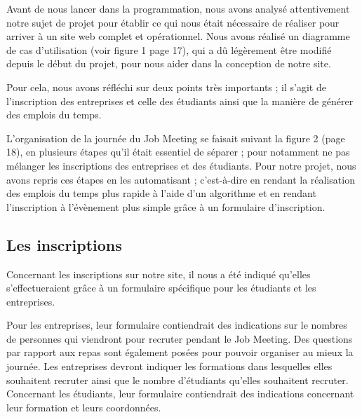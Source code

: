 \documentclass[12pt,a4paper]{article}
\begin{document}
\begin{large}
\begin{onehalfspace}Avant de nous lancer dans la programmation, nous avons analysé attentivement notre sujet de projet pour établir ce qui nous était nécessaire de réaliser pour arriver à un site web complet et opérationnel. Nous avons réalisé un diagramme de cas d’utilisation (voir figure 1 page 17), qui a dû légèrement être modifié depuis le début du projet, pour nous aider dans la conception de notre site.

	Pour cela, nous avons réfléchi sur deux points très importants ; il s’agit de l’inscription des entreprises et celle des étudiants ainsi que la manière de générer des emplois du temps.

	L’organisation de la journée du Job Meeting se faisait suivant la figure 2 (page 18), en plusieurs étapes qu’il était essentiel de séparer ; pour notamment ne pas mélanger les inscriptions des entreprises et des étudiants. Pour notre projet, nous avons repris ces étapes en les automatisant ; c’est-à-dire en rendant la réalisation des emplois du temps plus rapide à l’aide d’un algorithme et en rendant l’inscription à l’évènement plus simple grâce à un formulaire d’inscription.
\end{onehalfspace}
\end{large}


\subsection{Les inscriptions}

\begin{large}
\begin{onehalfspace}Concernant les inscriptions sur notre site, il nous a été indiqué qu’elles s’effectueraient grâce à un formulaire spécifique pour les étudiants et les entreprises.

    Pour les entreprises, leur formulaire contiendrait des indications sur le nombres de personnes qui viendront pour recruter  pendant le Job Meeting. Des questions par rapport aux repas sont également posées pour pouvoir organiser au mieux la journée. Les entreprises devront indiquer les formations dans lesquelles elles souhaitent recruter ainsi que le nombre d’étudiants qu’elles souhaitent recruter. Concernant les étudiants, leur formulaire contiendrait des indications concernant leur formation et leurs coordonnées.
\end{onehalfspace}
\end{large}
\end{document}
